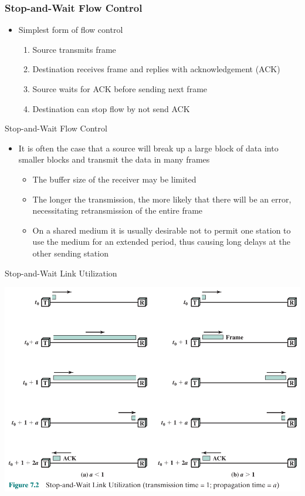 \documentclass[pdflatex,compress]{beamer}
\begin{document}
\begin{frame}
	\frametitle{Stop-and-Wait Flow Control}
	\begin{itemize}
		\item Simplest form of flow control
		\begin{enumerate}
			\item Source transmits frame
			\item Destination receives frame and replies with acknowledgement (ACK)
			\item Source waits for ACK before sending next frame
			\item Destination can stop flow by not send ACK
		\end{enumerate}
	\end{itemize}
\end{frame}

\begin{frame}{Stop-and-Wait Flow Control}
	\begin{itemize}
		\item It is often the case that a source will break up a large block of data into smaller blocks and transmit the data in many frames
		\begin{itemize}
			\item The buffer size of the receiver may be limited
			\item The longer the transmission, the more likely that there will be an error, necessitating retransmission of the entire frame
			\item On a shared medium it is usually desirable not to permit one station to use the medium for an extended period, thus causing long delays at the other sending station
		\end{itemize}
	\end{itemize}
\end{frame}

\begin{frame}{Stop-and-Wait Link Utilization}
	\begin{center}
		\includegraphics[width=0.9\linewidth]{img/img02}
	\end{center}
\end{frame}
\end{document}
